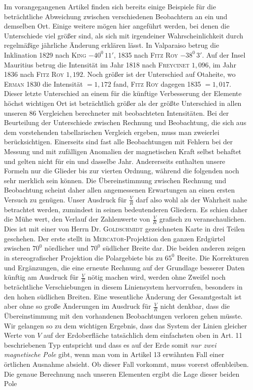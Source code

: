 \expandafter\def\csname HistoricalNoteText20\endcsname{Im vorangegangenen Artikel finden sich bereits einige Beispiele für die beträchtliche Abweichung zwischen verschiedenen Beobachtern an ein und demselben Ort. Einige weitere mögen hier angeführt werden, bei denen die Unterschiede viel größer sind, als sich mit irgendeiner Wahrscheinlichkeit durch regelmäßige jährliche Änderung erklären lässt. In Valparaiso betrug die Inklination 1829 nach \textsc{King} $-40^0\,11'$, 1835 nach \textsc{Fitz Roy} $-38^0\,3'$. Auf der Insel Mauritius betrug die Intensität im Jahr 1818 nach \textsc{Freycinet} $1{,}096$, im Jahr 1836 nach \textsc{Fitz Roy} $1{,}192$. Noch größer ist der Unterschied auf Otaheite, wo \textsc{Erman} 1830 die Intensität $=1{,}172$ fand, \textsc{Fitz Roy} dagegen 1835 $=1{,}017$. Dieser letzte Unterschied an einem für die künftige Verbesserung der Elemente höchst wichtigen Ort ist beträchtlich größer als der größte Unterschied in allen unseren 86 Vergleichen berechneter mit beobachteten Intensitäten.}
Bei der Beurteilung der Unterschiede zwischen Rechnung und Beobachtung, die sich aus dem vorstehenden tabellarischen Vergleich ergeben, muss man zweierlei berücksichtigen. Einerseits sind fast alle Beobachtungen mit Fehlern bei der Messung und mit zufälligen Anomalien der magnetischen Kraft selbst behaftet und gelten nicht für ein und dasselbe Jahr. Andererseits enthalten unsere Formeln nur die Glieder bis zur vierten Ordnung, während die folgenden noch sehr merklich sein können. Die Übereinstimmung zwischen Rechnung und Beobachtung scheint daher allen angemessenen Erwartungen an einen ersten Versuch zu genügen. Unser Ausdruck für $\frac VR$ darf also wohl als der Wahrheit nahe betrachtet werden, zumindest in seinen bedeutenderen Gliedern. Es schien daher die Mühe wert, den Verlauf der Zahlenwerte von $\frac VR$ grafisch zu veranschaulichen. Dies ist mit einer von Herrn Dr. \textsc{Goldschmidt} gezeichneten Karte in drei Teilen geschehen. Der erste stellt in \textsc{Mercator}-Projektion den ganzen Erdgürtel zwischen $70^0$ nördlicher und $70^0$ südlicher Breite dar. Die beiden anderen zeigen in stereografischer Projektion die Polargebiete bis zu $65^0$ Breite. Die Korrekturen und Ergänzungen, die eine erneute Rechnung auf der Grundlage besserer Daten künftig am Ausdruck für $\frac VR$ nötig machen wird, werden ohne Zweifel noch beträchtliche Verschiebungen in diesem Liniensystem hervorrufen, besonders in den hohen südlichen Breiten. Eine wesentliche Änderung der Gesamtgestalt ist aber ohne so große Änderungen im Ausdruck für $\frac VR$ nicht denkbar, dass die Übereinstimmung mit den vorhandenen Beobachtungen verloren gehen müsste. Wir gelangen so zu dem wichtigen Ergebnis, dass das System der
Linien gleicher Werte von $V$ auf der Erdoberfläche tatsächlich dem einfachsten oben in Art. 11 beschriebenen Typ entspricht und dass es auf der Erde somit \textit{nur zwei magnetische Pole} gibt, wenn man vom in Artikel 13 erwähnten Fall einer örtlichen Ausnahme absieht. Ob dieser Fall vorkommt, muss vorerst offenbleiben. Die genaue Berechnung nach unseren Elementen ergibt die Lage dieser beiden Pole

